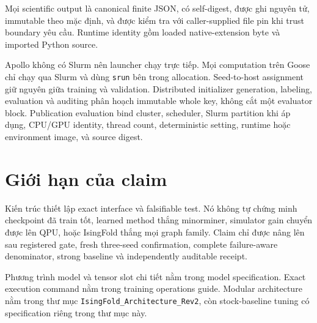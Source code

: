 \documentclass[
  vietnamese,
  10pt,
  a4paper,
]{article}
\begin{document}
Mọi scientific output là canonical finite JSON, có self-digest, được ghi
nguyên tử, immutable theo mặc định, và được kiểm tra với caller-supplied
file pin khi trust boundary yêu cầu. Runtime identity gồm loaded
native-extension byte và imported Python source.

Apollo không có Slurm nên launcher chạy trực tiếp. Mọi computation trên
Goose chỉ chạy qua Slurm và dùng \texttt{srun} bên trong allocation.
Seed-to-host assignment giữ nguyên giữa training và validation.
Distributed initializer generation, labeling, evaluation và auditing
phân hoạch immutable whole key, không cắt một evaluator block.
Publication evaluation bind cluster, scheduler, Slurm partition khi áp
dụng, CPU/GPU identity, thread count, deterministic setting, runtime
hoặc environment image, và source digest.

\section{Giới hạn của claim}\label{giux1edbi-hux1ea1n-cux1ee7a-claim}

Kiến trúc thiết lập exact interface và falsifiable test. Nó không tự
chứng minh checkpoint đã train tốt, learned method thắng minorminer,
simulator gain chuyển được lên QPU, hoặc IsingFold thắng mọi graph
family. Claim chỉ được nâng lên sau registered gate, fresh three-seed
confirmation, complete failure-aware denominator, strong baseline và
independently auditable receipt.

Phương trình model và tensor slot chi tiết nằm trong model
specification. Exact execution command nằm trong training operations
guide. Modular architecture nằm trong thư mục
\texttt{IsingFold\_Architecture\_Rev2}, còn stock-baseline tuning có
specification riêng trong thư mục này.
\end{document}
